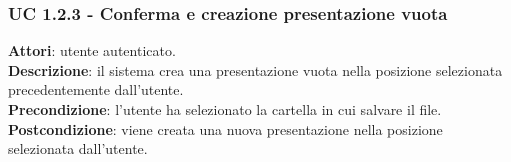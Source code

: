 \subsubsection{UC 1.2.3 - Conferma e creazione presentazione vuota}{
	\label{uc1.2.3}
	\textbf{Attori}: utente autenticato.	\\
	\textbf{Descrizione}: il sistema crea una presentazione vuota nella posizione selezionata precedentemente dall'utente.	\\
	\textbf{Precondizione}: l'utente ha selezionato la cartella in cui salvare il file.	\\
	\textbf{Postcondizione}: viene creata una nuova presentazione nella posizione selezionata dall'utente.	\\
	}